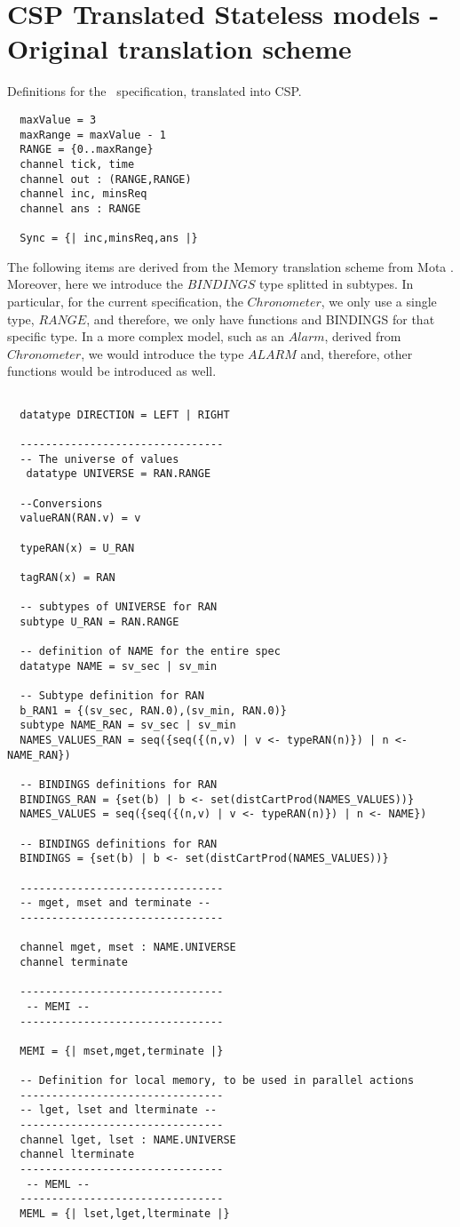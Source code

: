 \section{CSP Translated Stateless models - Original translation scheme}

Definitions for the \Circus\ specification, translated into CSP.
\begin{verbatim}
  maxValue = 3
  maxRange = maxValue - 1
  RANGE = {0..maxRange}
  channel tick, time
  channel out : (RANGE,RANGE)
  channel inc, minsReq
  channel ans : RANGE

  Sync = {| inc,minsReq,ans |}
\end{verbatim}
The following items are derived from the Memory translation
scheme from Mota \etal\cite{Nogueira2012}. Moreover, here we introduce the $BINDINGS$ type
splitted in subtypes. In particular, for the current specification, the
$Chronometer$, we only use a single type, $RANGE$, and therefore, we only
have functions and BINDINGS for that specific type. In a more complex model,
such as an $Alarm$, derived from $Chronometer$, we would introduce the
type $ALARM$ and, therefore, other functions would be introduced as well.
\begin{verbatim}

  datatype DIRECTION = LEFT | RIGHT

  --------------------------------
  -- The universe of values
   datatype UNIVERSE = RAN.RANGE

  --Conversions
  valueRAN(RAN.v) = v

  typeRAN(x) = U_RAN

  tagRAN(x) = RAN

  -- subtypes of UNIVERSE for RAN
  subtype U_RAN = RAN.RANGE

  -- definition of NAME for the entire spec
  datatype NAME = sv_sec | sv_min

  -- Subtype definition for RAN
  b_RAN1 = {(sv_sec, RAN.0),(sv_min, RAN.0)}
  subtype NAME_RAN = sv_sec | sv_min
  NAMES_VALUES_RAN = seq({seq({(n,v) | v <- typeRAN(n)}) | n <- NAME_RAN})

  -- BINDINGS definitions for RAN
  BINDINGS_RAN = {set(b) | b <- set(distCartProd(NAMES_VALUES))}
  NAMES_VALUES = seq({seq({(n,v) | v <- typeRAN(n)}) | n <- NAME})

  -- BINDINGS definitions for RAN
  BINDINGS = {set(b) | b <- set(distCartProd(NAMES_VALUES))}

  --------------------------------
  -- mget, mset and terminate --
  --------------------------------

  channel mget, mset : NAME.UNIVERSE
  channel terminate

  --------------------------------
   -- MEMI --
  --------------------------------

  MEMI = {| mset,mget,terminate |}

  -- Definition for local memory, to be used in parallel actions
  --------------------------------
  -- lget, lset and lterminate --
  --------------------------------
  channel lget, lset : NAME.UNIVERSE
  channel lterminate
  --------------------------------
   -- MEML --
  --------------------------------
  MEML = {| lset,lget,lterminate |}
\end{verbatim}

